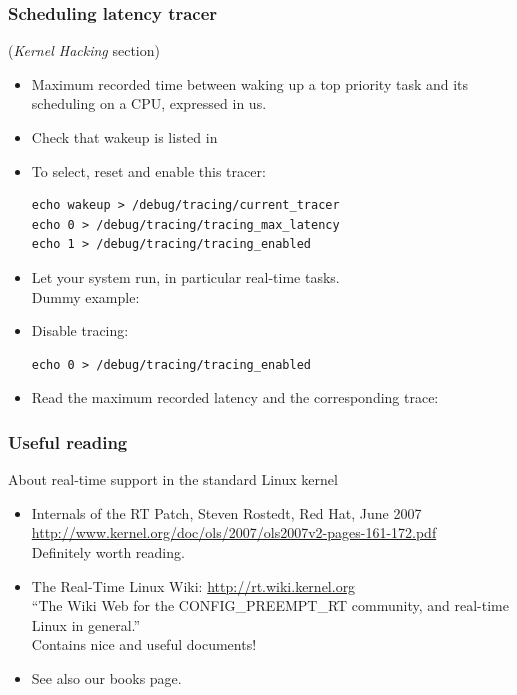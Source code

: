 \begin{frame}[fragile]
  \frametitle{Scheduling latency tracer}
  \small
   ({\em Kernel Hacking} section)
  \begin{itemize}
  \item Maximum recorded time between waking up a top priority task
    and its scheduling on a CPU, expressed in us.
  \item Check that wakeup is listed in
  \item To select, reset and enable this tracer:
    \begin{block}{}
\footnotesize
\begin{verbatim}
echo wakeup > /debug/tracing/current_tracer
echo 0 > /debug/tracing/tracing_max_latency
echo 1 > /debug/tracing/tracing_enabled
\end{verbatim}
\small
    \end{block}
  \item Let your system run, in particular real-time tasks.\\
    Dummy example: 
  \item Disable tracing:\\
    \begin{block}{}
\footnotesize
\begin{verbatim}
echo 0 > /debug/tracing/tracing_enabled
\end{verbatim}
\small
    \end{block}{}
  \item Read the maximum recorded latency and the corresponding trace:\\
  \end{itemize}
\end{frame}

\begin{frame}
  \frametitle{Useful reading}
  About real-time support in the standard Linux kernel
  \begin{itemize}
  \item Internals of the RT Patch, Steven Rostedt, Red Hat, June 2007\\
    \url{http://www.kernel.org/doc/ols/2007/ols2007v2-pages-161-172.pdf}\\
    Definitely worth reading.
  \item The Real-Time Linux Wiki: \url{http://rt.wiki.kernel.org}\\
    “The Wiki Web for the CONFIG\_PREEMPT\_RT community, and real-time Linux in general.”\\
    Contains nice and useful documents!
  \item See also our books page.
  \end{itemize}
\end{frame}

